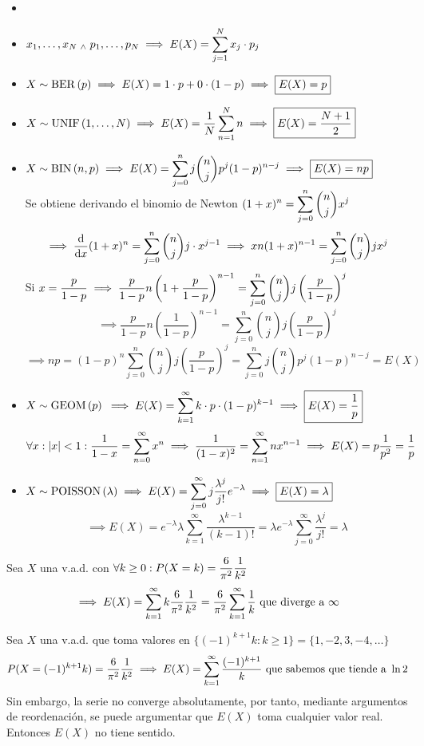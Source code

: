 \begin{ejem}
	\begin{itemize}[topsep=1pt, itemsep=1pt,parsep=3pt]
		\item[]
		\item $\displaystyle x_1, \dots, x_N \; _{\wedge} \; p_1, \dots, p_N \implies E(X)=\sum_{j=1}^N x_j\cdot p_j$
		\item $\displaystyle X\sim\operatorname{BER}\left(p\right) \implies E(X)=1\cdot p+0\cdot(1-p)\implies \boxed{E(X)=p}$
		\item $\displaystyle X\sim\operatorname{UNIF}\left(1, \dots, N\right) \implies E(X)=\frac{1}{N}\sum_{n=1}^N n \implies \boxed{E(X)=\frac{N+1}{2}}$
		\item $\displaystyle X\sim\operatorname{BIN}\left(n, p\right) \implies E(X)=\sum_{j=0}^n j\binom{n}{j}p^j(1-p)^{n-j}\implies \boxed{E(X)=np}$ \\
		      Se obtiene derivando el binomio de Newton $\displaystyle (1+x)^n=\sum_{j=0}^n \binom{n}{j} x^j$
		      \[\implies \odv{}{x}(1+x)^n=\sum_{j=0}^n \binom{n}{j} j\cdot x^{j-1} \implies xn(1+x)^{n-1}=\sum_{j=0}^n \binom{n}{j} jx^{j}\]
		      Si $\displaystyle x=\frac{p}{1-p} \implies \frac{p}{1-p}n\left(1+\frac{p}{1-p}\right)^{n-1}=\sum_{j=0}^n \binom{n}{j} j\left(\frac{p}{1-p}\right)^{j}$
		      \[\implies \frac{p}{1-p}n\left(\frac{1}{1-p}\right)^{n-1}=\sum_{j=0}^n \binom{n}{j} j\left(\frac{p}{1-p}\right)^{j}\]
		      \[\implies np=(1-p)^n\sum_{j=0}^n \binom{n}{j} j\left(\frac{p}{1-p}\right)^{j} = \sum_{j=0}^n j\binom{n}{j}p^j(1-p)^{n-j} = E(X)\]
		      \hfill \qedsymbol
		\item $X\sim \operatorname{GEOM}\left(p\right)$ $\displaystyle \implies E(X)=\sum_{k=1}^\infty k\cdot p\cdot(1-p)^{k-1} \implies \boxed{E(X)=\frac{1}{p}}$
		      \[\forall  x :\left|x\right|<1: \frac{1}{1-x}=\sum_{n=0}^\infty x^n\implies \frac{1}{(1-x)^2}=\sum_{n=1}^\infty nx^{n-1}\implies E(X)= p \frac{1}{p^2}=\frac{1}{p}\]
		      \hfill \qedsymbol
		\item $\displaystyle X\sim\operatorname{POISSON}\left(\lambda\right) \implies E(X)=\sum_{j=0}^\infty j\frac{\lambda^j}{j!}e^{-\lambda}\implies \boxed{E(X)=\lambda}$
		      \[\implies E(X)=e^{-\lambda}\lambda\sum_{k=1}^\infty \frac{\lambda^{k-1}}{(k-1)!}=\lambda e^{-\lambda}\sum_{j=0}^{\infty} \frac{\lambda^j}{j!}=\lambda\]
		      \hfill \qedsymbol
	\end{itemize}
\end{ejem}

\begin{ejem}
	Sea $X$ una v.a.d. con $\displaystyle \forall k \geq 0 : P(X=k)=\frac{6}{\pi^2}\frac{1}{k^2}$
	\[\implies E(X)=\sum_{k=1}^\infty k\frac{6}{\pi^2}\frac{1}{k^2}=\frac{6}{\pi^2}\sum_{k=1}^\infty \frac{1}{k} \text{  que diverge a } \infty\]
\end{ejem}
\begin{ejem}
	Sea $X$ una v.a.d. que toma valores en $\{(-1)^{k+1}k : k \geq 1\} = \{1, -2, 3, -4, \dots\}$
	\[P(X=(-1)^{k+1}k)=\frac{6}{\pi^2}\frac{1}{k^2} \implies E(X)=\sum_{k=1}^\infty \frac{(-1)^{k+1}}{k} \text{ que sabemos que tiende a } \ln{2}\]
	Sin embargo, la serie no converge absolutamente, por tanto, mediante argumentos de reordenación, se puede argumentar que $E(X)$ toma cualquier valor real. Entonces $E(X)$ no tiene sentido.
\end{ejem}

